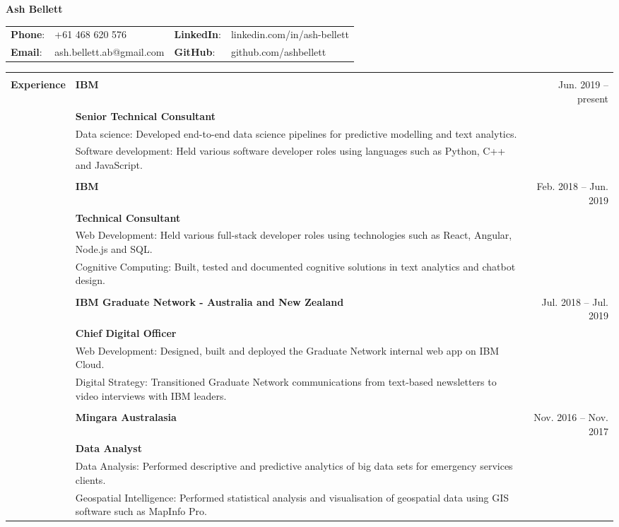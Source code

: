 \documentclass[a4paper,10pt]{letter}
\begin{document}
\vspace*{5px}

\LARGE
\textbf{Ash Bellett}\\
\large
\newline
\begin{tabular}{ @{} l l l l }
\textbf{Phone}: & +61 468 620 576 & \textbf{LinkedIn}: & linkedin.com/in/ash-bellett \\ 
\textbf{Email}: & ash.bellett.ab@gmail.com & \textbf{GitHub}: & github.com/ashbellett
\end{tabular}

\begin{tabular}{ @{} p{2.5cm} p{12cm} r }
\hline \\
\large
\textbf{Experience} & \textbf{IBM} & \normalsize Jun. 2019 -- present \\
 & \textbf{Senior Technical Consultant} & \\
\large
 & Data science: Developed end-to-end data science pipelines for predictive modelling and text analytics. & \\
 & Software development: Held various software developer roles using languages such as Python, C++ and JavaScript. & \\
 & & \\
\large
 & \textbf{IBM} & \normalsize Feb. 2018 -- Jun. 2019 \\
 & \textbf{Technical Consultant} & \\
\large
 & Web Development: Held various full-stack developer roles using technologies such as React, Angular, Node.js and SQL. & \\
 & Cognitive Computing: Built, tested and documented cognitive solutions in text analytics and chatbot design. & \\
 & & \\
\large
 & \textbf{IBM Graduate Network - Australia and New Zealand} & \normalsize Jul. 2018 -- Jul. 2019 \\
 & \textbf{Chief Digital Officer} & \\
\large
 & Web Development: Designed, built and deployed the Graduate Network internal web app on IBM Cloud. & \\
 & Digital Strategy: Transitioned Graduate Network communications from text-based newsletters to video interviews with IBM leaders. & \\
 & & \\
\large
 & \textbf{Mingara Australasia} & \normalsize Nov. 2016 -- Nov. 2017 \\
 & \textbf{Data Analyst} & \\
\large
 & Data Analysis: Performed descriptive and predictive analytics of big data sets for emergency services clients. & \\
 & Geospatial Intelligence: Performed statistical analysis and visualisation of geospatial data using GIS software such as MapInfo Pro. & \\


\end{tabular}
\end{document}
